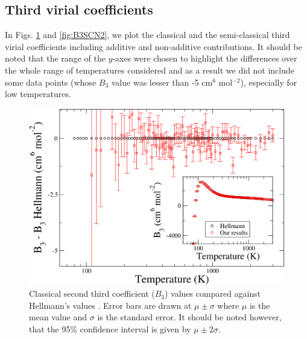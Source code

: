     \subsection{Third virial coefficients}
        In Figs. \ref{fig:B3CLN2} and \ref{fig:B3SCN2}, we plot the classical and the semi-classical third virial coefficients including additive and non-additive contributions. It should be noted that the range of the $y$-axes were chosen to highlight the differences over the whole range of temperatures considered and as a result we did not include some data points (whose $B_3$ value was lesser than -5 cm$^6$ mol$^{-2}$), especially for low temperatures.
        \begin{figure}[!htbp]
            \centering
            \includegraphics[scale=0.20,keepaspectratio]{Chapter-5/Figures/B3CLFull9sResultsAll.png}
            \caption{Classical second third coefficient ($B_3$) values compared against Hellmann's values \cite{Hellmann2013}. Error bars are drawn at $\mu \pm \sigma$ where $\mu$ is the mean value and $\sigma$ is the standard error. It should be noted however, that the 95\% confidence interval is given by $\mu \pm 2\sigma$.}
            \label{fig:B3CLN2}
        \end{figure}

